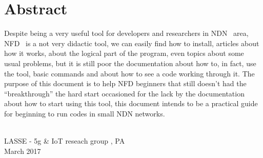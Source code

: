 \documentclass[10pt,letterpaper,extrafontsizes]{memoir}
\newcommand\svnidlong[4]{}
\begin{document}
\pagestyle{headings}

\setupshorttoc
\setupparasubsecs
\setupmaintoc
\setlength{\unitlength}{1pt}
\clearpage




\svnidlong
{$Ignore: $}
{$LastChangedDate: 2014-11-05 16:28:11 +0100 (Wed, 05 Nov 2014) $}
{$LastChangedRevision: 501 $}
{$LastChangedBy: daleif $}

\chapter{Abstract}
Despite being a very useful tool for developers and researchers in NDN~\cite{ndn} area, NFD~\cite{NFD} is a not very didactic tool, we can easily find how to install, articles about how it works, about the logical part of the program, even topics about some usual problems, but it is still poor the documentation about how to, in fact, use the tool, basic commands and about how to see a code working through it. The purpose of this document is to help NFD beginners that still doesn't had the ``breakthrough'' the hard start occasioned for the lack by the documentation about how to start using this tool, this document intends to be a practical guide for beginning to run codes in small NDN networks. 

{ \\ LASSE - 5g \& IoT reseach group , PA \\ March 2017\par}

\svnidlong
{$Ignore: $}
{$LastChangedDate: 2015-04-22 17:17:51 +0200 (Wed, 22 Apr 2015) $}
{$LastChangedRevision: 527 $}
{$LastChangedBy: daleif $}
\end{document}
